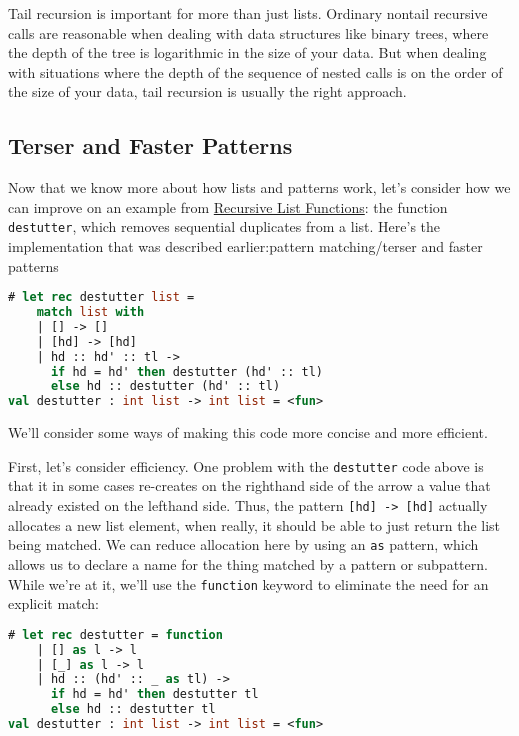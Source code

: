 Tail recursion is important for more than just lists. Ordinary nontail
recursive calls are reasonable when dealing with data structures like
binary trees, where the depth of the tree is logarithmic in the size of
your data. But when dealing with situations where the depth of the
sequence of nested calls is on the order of the size of your data, tail
recursion is usually the right approach.

\hypertarget{terser-and-faster-patterns}{%
\subsection{Terser and Faster
Patterns}\label{terser-and-faster-patterns}}

Now that we know more about how lists and patterns work, let's consider
how we can improve on an example from
\href{guided-tour.html\#recursive-list-functions}{Recursive List
Functions}: the function \passthrough{\lstinline!destutter!}, which
removes sequential duplicates from a list. Here's the implementation
that was described earlier:\protect\hypertarget{PTTRNMAT}{}{pattern matching/terser and
faster patterns}

\begin{lstlisting}[language=Caml]
# let rec destutter list =
    match list with
    | [] -> []
    | [hd] -> [hd]
    | hd :: hd' :: tl ->
      if hd = hd' then destutter (hd' :: tl)
      else hd :: destutter (hd' :: tl)
val destutter : int list -> int list = <fun>
\end{lstlisting}

We'll consider some ways of making this code more concise and more
efficient.

First, let's consider efficiency. One problem with the
\passthrough{\lstinline!destutter!} code above is that it in some cases
re-creates on the righthand side of the arrow a value that already
existed on the lefthand side. Thus, the pattern
\passthrough{\lstinline![hd] -> [hd]!} actually allocates a new list
element, when really, it should be able to just return the list being
matched. We can reduce allocation here by using an
\passthrough{\lstinline!as!} pattern, which allows us to declare a name
for the thing matched by a pattern or subpattern. While we're at it,
we'll use the \passthrough{\lstinline!function!} keyword to eliminate
the need for an explicit match:

\begin{lstlisting}[language=Caml]
# let rec destutter = function
    | [] as l -> l
    | [_] as l -> l
    | hd :: (hd' :: _ as tl) ->
      if hd = hd' then destutter tl
      else hd :: destutter tl
val destutter : int list -> int list = <fun>
\end{lstlisting}

